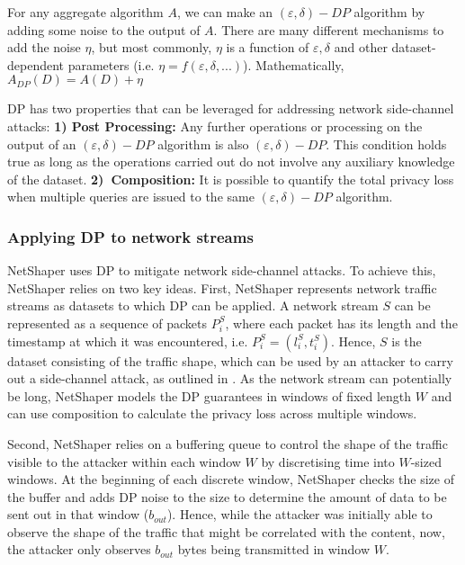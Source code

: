 For any aggregate algorithm $A$, we can make an $(\varepsilon, \delta)-DP$ algorithm by adding some noise to the output of $A$.
There are many different mechanisms to add the noise $\eta$, but most commonly, $\eta$ is a function of $\varepsilon, \delta$ and other dataset-dependent parameters (i.e. $\eta = f(\varepsilon, \delta, ...)$).
Mathematically, $A_{DP}(D) = A(D) + \eta$

DP has two properties that can be leveraged for addressing network side-channel attacks: 
\textbf{1) Post Processing:} Any further operations or processing on the output of an $(\varepsilon, \delta)-DP$ algorithm is also $(\varepsilon, \delta)-DP$.
This condition holds true as long as the operations carried out do not involve any auxiliary knowledge of the dataset.
\textbf{2)~Composition:} It is possible to quantify the total privacy loss when multiple queries are issued to the same $(\varepsilon, \delta)-DP$ algorithm.

\subsubsection{Applying DP to network streams}
\label{subsubsec:netshaper-background-framework-applying-dp}
NetShaper uses DP to mitigate network side-channel attacks. 
To achieve this, NetShaper relies on two key ideas.
First, NetShaper represents network traffic streams as datasets to which DP can be applied.
A network stream $S$ can be represented as a sequence of packets $P_i^S$, where each packet has its length and the timestamp at which it was encountered, i.e. $P_i^S = (l_i^S, t_i^S)$.
Hence, $S$ is the dataset consisting of the traffic shape, which can be used by an attacker to carry out a side-channel attack, as outlined in .
As the network stream can potentially be long, NetShaper models the DP guarantees in windows of fixed length $W$ and can use composition to calculate the privacy loss across multiple windows.

Second, NetShaper relies on a buffering queue to control the shape of the traffic visible to the attacker within each window $W$ by discretising time into $W$-sized windows.
At the beginning of each discrete window, NetShaper checks the size of the buffer and adds DP noise to the size to determine the amount of data to be sent out in that window ($b_{out}$).
Hence, while the attacker was initially able to observe the shape of the traffic that might be correlated with the content, now, the attacker only observes $b_{out}$ bytes being transmitted in window $W$.


